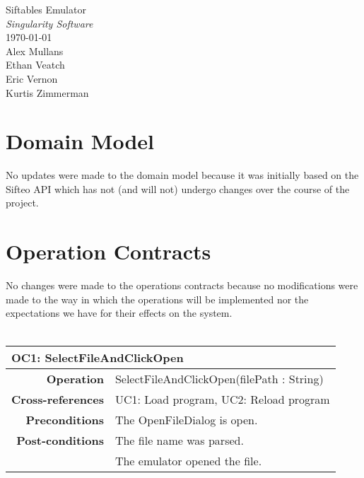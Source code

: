\documentclass[12pt]{article}
\begin{document}
\vspace*{\fill}
        \begin{center}
                \LARGE{Siftables Emulator} \\
                \LARGE{\textit{Singularity Software}} \\
                \vspace{.15in}
                \large{\today} \\
                \vspace{4in}
                        Alex Mullans \\
                        Ethan Veatch \\
                        Eric Vernon \\
                        Kurtis Zimmerman
        \end{center}
\vspace*{\fill}
\thispagestyle{empty}

\clearpage

\section{Domain Model}
No updates were made to the domain model because it was initially based on the Sifteo API which has not (and will not) undergo changes over the course of the project.

\section{Operation Contracts}
No changes were made to the operations contracts because no modifications were made to the way in which the operations will be implemented nor the expectations we have for their effects on the system.
\\\\
\begin{tabular*}{\textwidth}{r | l}
  \multicolumn{2}{l}{\textbf{OC1: SelectFileAndClickOpen}} \\ \hline
  \textbf{Operation} & SelectFileAndClickOpen(filePath : String) \\
  \textbf{Cross-references} & UC1: Load  program, UC2: Reload program \\
  \textbf{Preconditions} & The OpenFileDialog is open. \\
  \textbf{Post-conditions} & The file name was parsed. \\
                            & The emulator opened the file. \\ \hline
\end{tabular*} \\\\
\end{document}
